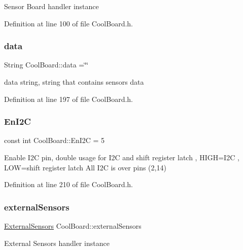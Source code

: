 Sensor Board handler instance 

Definition at line 100 of file Cool\+Board.\+h.

\mbox{\label{class_cool_board_a427fb753dd8575bdf821c70a5c63d695}} 
\subsubsection{\texorpdfstring{data}{data}}
{\footnotesize\ttfamily String Cool\+Board\+::data =\char`\"{}\char`\"{}\hspace{0.3cm}{\ttfamily [private]}}

data string, string that contains sensors data 

Definition at line 197 of file Cool\+Board.\+h.

\mbox{\label{class_cool_board_af1fe1376fc66f93dee80b327ca695377}} 
\subsubsection{\texorpdfstring{En\+I2C}{EnI2C}}
{\footnotesize\ttfamily const int Cool\+Board\+::\+En\+I2C = 5\hspace{0.3cm}{\ttfamily [private]}}

Enable I2C pin, double usage for I2C and shift register latch , H\+I\+GH=I2C , L\+OW=shift register latch All I2C is over pins (2,14) 

Definition at line 210 of file Cool\+Board.\+h.

\mbox{\label{class_cool_board_a09e26264839c65873eb56af476eff6b2}} 
\subsubsection{\texorpdfstring{external\+Sensors}{externalSensors}}
{\footnotesize\ttfamily \hyperlink{class_external_sensors}{External\+Sensors} Cool\+Board\+::external\+Sensors\hspace{0.3cm}{\ttfamily [private]}}

External Sensors handler instance 

